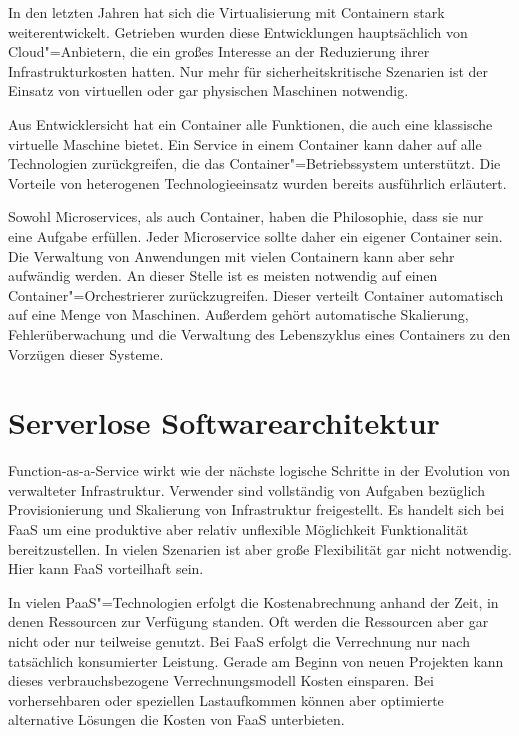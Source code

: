 In den letzten Jahren hat sich die Virtualisierung mit Containern stark weiterentwickelt. Getrieben wurden diese Entwicklungen hauptsächlich von Cloud"=Anbietern, die ein großes Interesse an der Reduzierung ihrer Infrastrukturkosten hatten. Nur mehr für sicherheitskritische Szenarien ist der Einsatz von virtuellen oder gar physischen Maschinen notwendig.

Aus Entwicklersicht hat ein Container alle Funktionen, die auch eine klassische virtuelle Maschine bietet. Ein Service in einem Container kann daher auf alle Technologien zurückgreifen, die das Container"=Betriebssystem unterstützt. Die Vorteile von heterogenen Technologieeinsatz wurden bereits ausführlich erläutert.

Sowohl Microservices, als auch Container, haben die Philosophie, dass sie nur eine Aufgabe erfüllen. Jeder Microservice sollte daher ein eigener Container sein. Die Verwaltung von Anwendungen mit vielen Containern kann aber sehr aufwändig werden. An dieser Stelle ist es meisten notwendig auf einen Container"=Orchestrierer zurückzugreifen. Dieser verteilt Container automatisch auf eine Menge von Maschinen. Außerdem gehört automatische Skalierung, Fehlerüberwachung und die Verwaltung des Lebenszyklus eines Containers zu den Vorzügen dieser Systeme.

\section{Serverlose Softwarearchitektur}

Function-as-a-Service wirkt wie der nächste logische Schritte in der Evolution von verwalteter Infrastruktur. Verwender sind vollständig von Aufgaben bezüglich Provisionierung und Skalierung von Infrastruktur freigestellt. Es handelt sich bei FaaS um eine produktive aber relativ unflexible Möglichkeit Funktionalität bereitzustellen. In vielen Szenarien ist aber große Flexibilität gar nicht notwendig. Hier kann FaaS vorteilhaft sein.

In vielen PaaS"=Technologien erfolgt die Kostenabrechnung anhand der Zeit, in denen Ressourcen zur Verfügung standen. Oft werden die Ressourcen aber gar nicht oder nur teilweise genutzt. Bei FaaS erfolgt die Verrechnung nur nach tatsächlich konsumierter Leistung. Gerade am Beginn von neuen Projekten kann dieses verbrauchsbezogene Verrechnungsmodell Kosten einsparen. Bei vorhersehbaren oder speziellen Lastaufkommen können aber optimierte alternative Lösungen die Kosten von FaaS unterbieten.

